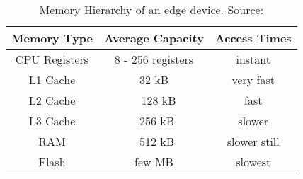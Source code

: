 \begin{table}[]
    \centering
        \begin{tabular}{|c|c|c|} \hline
            Memory Type & Average Capacity & Access Times \\\hline
            CPU Registers & 8 - 256 registers & instant \\\hline
            L1 Cache & 32 kB & very fast \\\hline
            L2 Cache & ~ 128 kB & fast \\\hline
            L3 Cache & ~256 kB & slower \\\hline
            RAM & ~512 kB & slower still \\\hline
            Flash & few MB & slowest \\\hline
        \end{tabular}
    \caption{Memory Hierarchy of an edge device. Source: \cite{stm32_cache}}
    \label{tab:memory_hierarchy}
\end{table}

